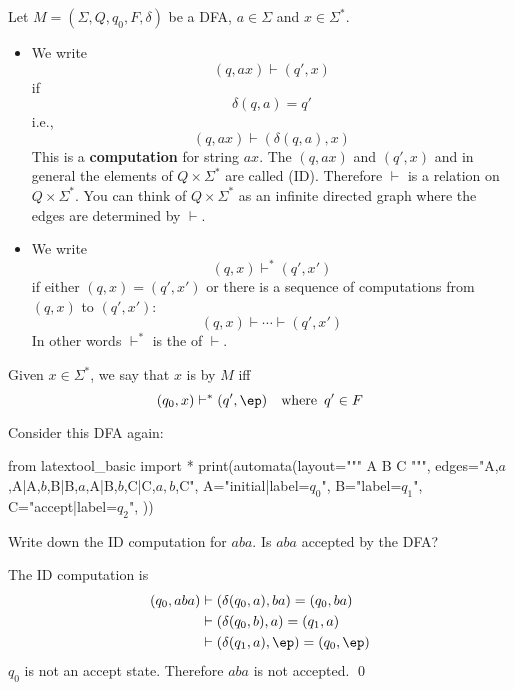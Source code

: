 \begin{defn}
Let $M=(\Sigma,Q,q_0,F,\delta)$ be a DFA, $a\in\Sigma$ and $x \in
\Sigma^*$.
\begin{itemize}
  \item We write
   \[ (q,ax) \vdash (q',x) \]
   if
   \[ \delta(q,a) = q' \]
   i.e.,
   \[
   (q,ax) \vdash (\delta(q,a),x)
   \]
   This is a \textbf{computation} for string $ax$.
   The $(q, ax)$ and $(q', x)$ and in general
   the elements of $Q \times \Sigma^*$ are called
    (ID).
   Therefore $\vdash$ is a relation on $Q \times \Sigma^*$.
   You can think of $Q \times \Sigma^*$ as an infinite
   directed graph where the edges are determined by $\vdash$.

  \item We write
  \[ (q,x) \vdash^* (q',x') \]
  if either $(q,x) = (q',x')$ or there is a sequence of
  computations from $(q,x)$ to $(q',x')$:
  \[ (q,x) \vdash \cdots \vdash (q',x') \]
  In other words $\vdash^*$ is the  of $\vdash$.
\end{itemize}
\end{defn}


\begin{defn}
Given $x \in \Sigma^*$, we say that $x$ is
 by $M$ iff
\[(q_0,x) \vdash^* (q',\ep) \quad \text{where \,} q' \in F \]
\end{defn}



\newpage
\begin{eg} Consider this DFA again:
  \begin{python}
from latextool_basic import *
print(automata(layout="""
A  B  C
""",
edges="A,$a$,A|A,$b$,B|B,$a$,A|B,$b$,C|C,$a,b$,C",
A="initial|label=$q_0$",
B="label=$q_1$",
C="accept|label=$q_2$",
))
  \end{python}
  Write down the ID computation for $aba$. Is $aba$ accepted by the DFA?

  \SOLUTION
  The ID computation is
  \begin{align*}
    (q_0, aba)
    &\vdash (\delta(q_0, a), ba) = (q_0, ba) \\ 
    &\vdash (\delta(q_0, b), a) = (q_1, a) \\
    &\vdash (\delta(q_1, a), \ep) = (q_0, \ep)
  \end{align*}
  $q_0$ is not an accept state. Therefore $aba$ is not accepted.
  \qed
\end{eg}

